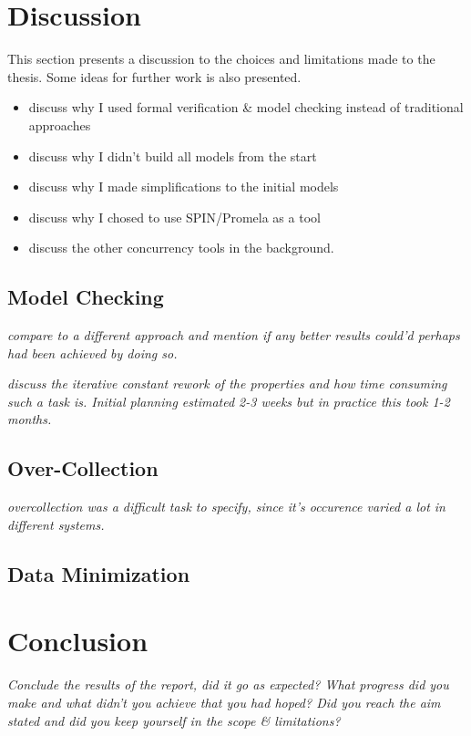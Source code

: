 \chapter{Discussion} 

This section presents a discussion to the choices and limitations made to the thesis. Some ideas for further work is also presented.

\begin{itemize}
\item discuss why I used formal verification \& model checking instead of traditional approaches
\item discuss why I didn't build all models from the start
\item discuss why I made simplifications to the initial models
\item discuss why I chosed to use SPIN/Promela as a tool
\item discuss the other concurrency tools in the background.
\end{itemize}

\section{Model Checking}

\textit{compare to a different approach and mention if any better results could'd perhaps had been achieved by doing so.}

\textit{discuss the iterative constant rework of the properties and how time consuming such a task is. Initial planning estimated 2-3 weeks but in practice this took 1-2 months.}

\section{Over-Collection}

\textit{overcollection was a difficult task to specify, since it's occurence varied a lot in different systems. }


\section{Data Minimization}



\chapter{Conclusion}

\textit{Conclude the results of the report, did it go as expected? What progress did you make and what didn't you achieve that you had hoped? Did you reach the aim stated and did you keep yourself in the scope \& limitations? }

